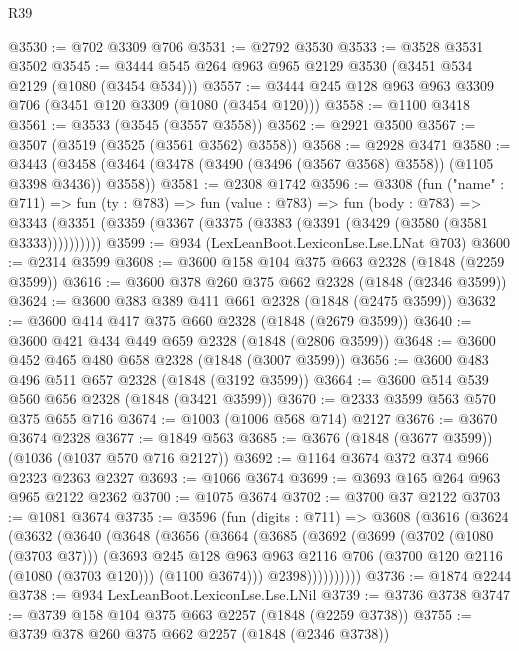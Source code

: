 \begin{lexlean}{R39}
\begin{coremodule}
@3530 := @702 @3309 @706
@3531 := @2792 @3530
@3533 := @3528 @3531 @3502
@3545 := @3444 @545 @264 @963 @965 @2129 @3530 (@3451 @534 @2129 (@1080 (@3454 @534)))
@3557 := @3444 @245 @128 @963 @963 @3309 @706 (@3451 @120 @3309 (@1080 (@3454 @120)))
@3558 := @1100 @3418
@3561 := @3533 (@3545 (@3557 @3558))
@3562 := @2921 @3500
@3567 := @3507 (@3519 (@3525 (@3561 @3562) @3558))
@3568 := @2928 @3471
@3580 := @3443 (@3458 (@3464 (@3478 (@3490 (@3496 (@3567 @3568) @3558)) (@1105 @3398 @3436)) @3558))
@3581 := @2308 @1742
@3596 := @3308
    (fun ("name" : @711) =>
    fun (ty : @783) =>
    fun (value : @783) =>
    fun (body : @783) =>
    @3343 (@3351 (@3359 (@3367 (@3375 (@3383 (@3391 (@3429 (@3580 (@3581 @3333))))))))))
@3599 := @934 (LexLeanBoot.LexiconLse.Lse.LNat @703)
@3600 := @2314 @3599
@3608 := @3600 @158 @104 @375 @663 @2328 (@1848 (@2259 @3599))
@3616 := @3600 @378 @260 @375 @662 @2328 (@1848 (@2346 @3599))
@3624 := @3600 @383 @389 @411 @661 @2328 (@1848 (@2475 @3599))
@3632 := @3600 @414 @417 @375 @660 @2328 (@1848 (@2679 @3599))
@3640 := @3600 @421 @434 @449 @659 @2328 (@1848 (@2806 @3599))
@3648 := @3600 @452 @465 @480 @658 @2328 (@1848 (@3007 @3599))
@3656 := @3600 @483 @496 @511 @657 @2328 (@1848 (@3192 @3599))
@3664 := @3600 @514 @539 @560 @656 @2328 (@1848 (@3421 @3599))
@3670 := @2333 @3599 @563 @570 @375 @655 @716
@3674 := @1003 (@1006 @568 @714) @2127
@3676 := @3670 @3674 @2328
@3677 := @1849 @563
@3685 := @3676 (@1848 (@3677 @3599)) (@1036 (@1037 @570 @716 @2127))
@3692 := @1164 @3674 @372 @374 @966 @2323 @2363 @2327
@3693 := @1066 @3674
@3699 := @3693 @165 @264 @963 @965 @2122 @2362
@3700 := @1075 @3674
@3702 := @3700 @37 @2122
@3703 := @1081 @3674
@3735 := @3596
    (fun (digits : @711) =>
    @3608
      (@3616
        (@3624
          (@3632
            (@3640
              (@3648
                (@3656
                  (@3664
                    (@3685
                      (@3692
                        (@3699
                          (@3702 (@1080 (@3703 @37)))
                          (@3693
                            @245
                            @128
                            @963
                            @963
                            @2116
                            @706
                            (@3700 @120 @2116 (@1080 (@3703 @120)))
                            (@1100 @3674)))
                        @2398))))))))))
@3736 := @1874 @2244
@3738 := @934 LexLeanBoot.LexiconLse.Lse.LNil
@3739 := @3736 @3738
@3747 := @3739 @158 @104 @375 @663 @2257 (@1848 (@2259 @3738))
@3755 := @3739 @378 @260 @375 @662 @2257 (@1848 (@2346 @3738))

\end{coremodule}
\end{lexlean}
